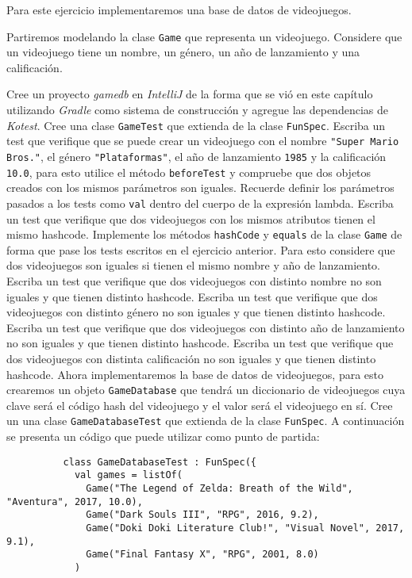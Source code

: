   \begin{Exercise}[title={Bases de datos}]
    Para este ejercicio implementaremos una base de datos de videojuegos.

    \ExePart
      Partiremos modelando la clase \texttt{Game} que representa un videojuego.
      Considere que un videojuego tiene un nombre, un género, un año de lanzamiento y una
      calificación.

      \Question Cree un proyecto \textit{gamedb} en \textit{IntelliJ} de la forma que se vió en 
        este capítulo utilizando \textit{Gradle} como sistema de construcción y agregue las 
        dependencias de \textit{Kotest}.
      \Question Cree una clase \texttt{GameTest} que extienda de la clase \texttt{FunSpec}.
      \Question Escriba un test que verifique que se puede crear un videojuego con el nombre
        \texttt{"Super Mario Bros."}, el género \texttt{"Plataformas"}, el año de lanzamiento
        \texttt{1985} y la calificación \texttt{10.0}, para esto utilice el método 
        \texttt{beforeTest} y compruebe que dos objetos creados con los mismos parámetros son
        iguales.
        Recuerde definir los parámetros pasados a los tests como \texttt{val} dentro 
        del cuerpo de la expresión lambda.
      \Question Escriba un test que verifique que dos videojuegos con los mismos atributos tienen
        el mismo hashcode.
      \Question Implemente los métodos \texttt{hashCode} y \texttt{equals} de la clase \texttt{Game}
        de forma que pase los tests escritos en el ejercicio anterior.
        Para esto considere que dos videojuegos son iguales si tienen el mismo nombre y año de
        lanzamiento.
      \Question Escriba un test que verifique que dos videojuegos con distinto nombre no son 
        iguales y que tienen distinto hashcode.
      \Question Escriba un test que verifique que dos videojuegos con distinto género no son
        iguales y que tienen distinto hashcode.
      \Question Escriba un test que verifique que dos videojuegos con distinto año de lanzamiento
        no son iguales y que tienen distinto hashcode.
      \Question Escriba un test que verifique que dos videojuegos con distinta calificación no son
        iguales y que tienen distinto hashcode.
    \ExePart
      Ahora implementaremos la base de datos de videojuegos, para esto crearemos un objeto 
      \texttt{GameDatabase} que tendrá un diccionario de videojuegos cuya clave será el código
        hash del videojuego y el valor será el videojuego en sí.
      \Question Cree un una clase \texttt{GameDatabaseTest} que extienda de la clase 
        \texttt{FunSpec}.
        A continuación se presenta un código que puede utilizar como punto de partida:
        \begin{verbatim}
          class GameDatabaseTest : FunSpec({
            val games = listOf(
              Game("The Legend of Zelda: Breath of the Wild", "Aventura", 2017, 10.0),
              Game("Dark Souls III", "RPG", 2016, 9.2),
              Game("Doki Doki Literature Club!", "Visual Novel", 2017, 9.1),
              Game("Final Fantasy X", "RPG", 2001, 8.0)
            )


\end{verbatim}
\end{Exercise}
